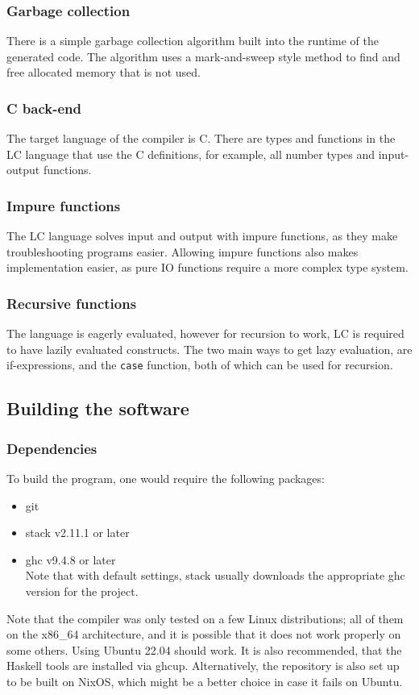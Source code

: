 \documentclass[12pt]{article}
\begin{document}
\subsubsection{Garbage collection}

There is a simple garbage collection algorithm built into the runtime of the
generated code. The algorithm uses a mark-and-sweep style method to find and
free allocated memory that is not used.

\subsubsection{C back-end}

The target language of the compiler is C. There are types and functions in the
LC language that use the C definitions, for example, all number types and
input-output functions.

\subsubsection{Impure functions}

The LC language solves input and output with impure functions, as they make
troubleshooting programs easier. Allowing impure functions also makes
implementation easier, as pure IO functions require a more complex type system.

\subsubsection{Recursive functions}

The language is eagerly evaluated, however for recursion to work, LC is required
to have lazily evaluated constructs. The two main ways to get lazy evaluation,
are if-expressions, and the \verb$case$ function, both of which can be used for
recursion.

\subsection{Building the software}
\subsubsection{Dependencies}

To build the program, one would require the following packages:
\begin{itemize}
    \item git
    \item stack v2.11.1 or later
    \item ghc v9.4.8 or later \\ Note that with default settings, stack usually
        downloads the appropriate ghc version for the project.
\end{itemize}
Note that the compiler was only tested on a few Linux distributions; all of them
on the x86\_64 architecture, and it is possible that it does not work properly
on some others. Using Ubuntu 22.04 should work. It is also recommended, that the
Haskell tools are installed via ghcup. Alternatively, the repository is also set
up to be built on NixOS, which might be a better choice in case it fails on
Ubuntu.
\end{document}
